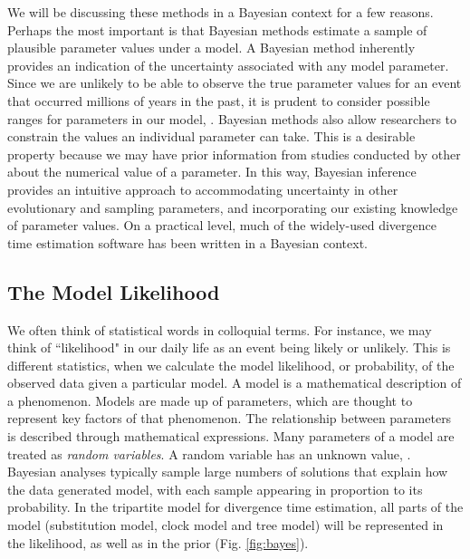 We will be discussing these methods in a Bayesian context for a few reasons.
Perhaps the most important is that Bayesian methods estimate a sample of plausible parameter values under a model. 
A Bayesian method inherently provides an indication of the uncertainty associated with any model parameter.
Since we are unlikely to be able to observe the true parameter values for an event that occurred millions of years in the past, it is prudent to consider possible ranges for parameters in our model, .
Bayesian methods also allow researchers to constrain the values an individual parameter can take. 
This is a desirable property because we may have prior information from studies conducted by other  about the numerical value of a parameter.
In this way, Bayesian inference provides an intuitive approach to accommodating uncertainty in other evolutionary and sampling parameters, and incorporating our existing knowledge of parameter values.
On a practical level, much of the widely-used divergence time estimation software has been written in a Bayesian context.


\subsection{The Model Likelihood}

We often think of statistical words in colloquial terms.
For instance, we may think of ``likelihood" in our daily life as an event being likely or unlikely. 
This is different  statistics, when we calculate the model likelihood, or probability, of the observed data given a particular model.
A model is a mathematical description of a phenomenon.
Models are made up of parameters, which are thought to represent key factors of that phenomenon.
The relationship between parameters is described through mathematical expressions.
Many parameters of a model are treated as \textit{random variables}.
A random variable has an unknown value, .
Bayesian analyses typically sample large numbers of solutions that explain how the data  generated  model, with each sample appearing in proportion to its probability.
In the tripartite model for divergence time estimation, all parts of the model (substitution model, clock model and tree model) will be represented in the likelihood, as well as in the prior (Fig. \ref{fig:bayes}).


